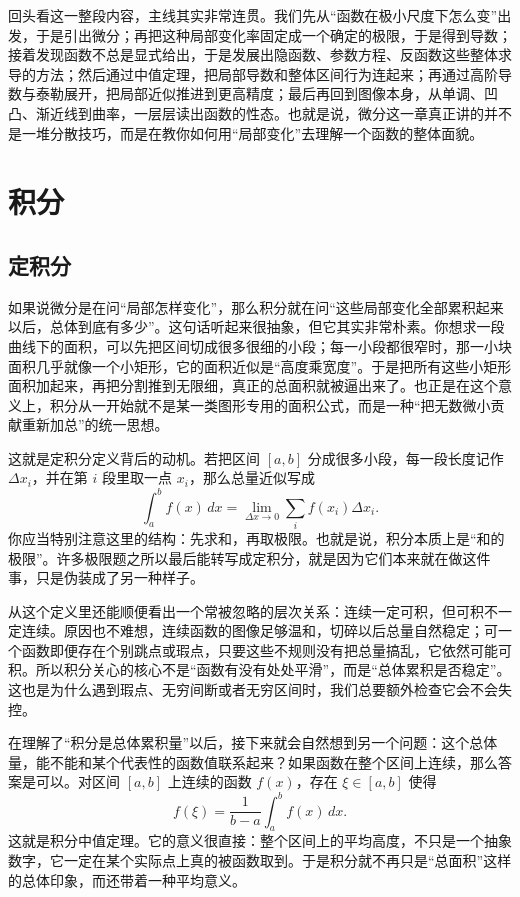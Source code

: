 \documentclass[UTF8]{ctexbook}
\begin{document}
回头看这一整段内容，主线其实非常连贯。我们先从“函数在极小尺度下怎么变”出发，于是引出微分；再把这种局部变化率固定成一个确定的极限，于是得到导数；接着发现函数不总是显式给出，于是发展出隐函数、参数方程、反函数这些整体求导的方法；然后通过中值定理，把局部导数和整体区间行为连起来；再通过高阶导数与泰勒展开，把局部近似推进到更高精度；最后再回到图像本身，从单调、凹凸、渐近线到曲率，一层层读出函数的性态。也就是说，微分这一章真正讲的并不是一堆分散技巧，而是在教你如何用“局部变化”去理解一个函数的整体面貌。

\newpage
\section{积分}
\subsection{定积分}
如果说微分是在问“局部怎样变化”，那么积分就在问“这些局部变化全部累积起来以后，总体到底有多少”。这句话听起来很抽象，但它其实非常朴素。你想求一段曲线下的面积，可以先把区间切成很多很细的小段；每一小段都很窄时，那一小块面积几乎就像一个小矩形，它的面积近似是“高度乘宽度”。于是把所有这些小矩形面积加起来，再把分割推到无限细，真正的总面积就被逼出来了。也正是在这个意义上，积分从一开始就不是某一类图形专用的面积公式，而是一种“把无数微小贡献重新加总”的统一思想。

这就是定积分定义背后的动机。若把区间 $[a,b]$ 分成很多小段，每一段长度记作 $\Delta x_i$，并在第 $i$ 段里取一点 $x_i$，那么总量近似写成
\[
\int_a^b f(x)\,dx=\lim_{\Delta x\to 0}\sum_i f(x_i)\Delta x_i.
\]
你应当特别注意这里的结构：先求和，再取极限。也就是说，积分本质上是“和的极限”。许多极限题之所以最后能转写成定积分，就是因为它们本来就在做这件事，只是伪装成了另一种样子。

从这个定义里还能顺便看出一个常被忽略的层次关系：连续一定可积，但可积不一定连续。原因也不难想，连续函数的图像足够温和，切碎以后总量自然稳定；可一个函数即便存在个别跳点或瑕点，只要这些不规则没有把总量搞乱，它依然可能可积。所以积分关心的核心不是“函数有没有处处平滑”，而是“总体累积是否稳定”。这也是为什么遇到瑕点、无穷间断或者无穷区间时，我们总要额外检查它会不会失控。

在理解了“积分是总体累积量”以后，接下来就会自然想到另一个问题：这个总体量，能不能和某个代表性的函数值联系起来？如果函数在整个区间上连续，那么答案是可以。对区间 $[a,b]$ 上连续的函数 $f(x)$，存在 $\xi\in[a,b]$ 使得
\[
f(\xi)=\frac{1}{b-a}\int_a^b f(x)\,dx.
\]
这就是积分中值定理。它的意义很直接：整个区间上的平均高度，不只是一个抽象数字，它一定在某个实际点上真的被函数取到。于是积分就不再只是“总面积”这样的总体印象，而还带着一种平均意义。
\end{document}
